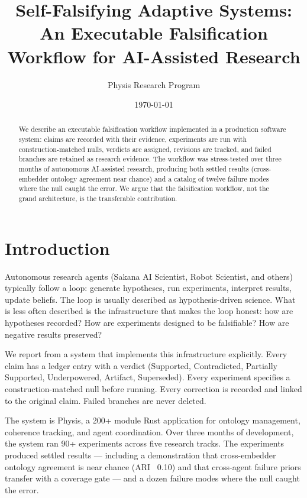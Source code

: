 \documentclass[11pt]{article}
\title{Self-Falsifying Adaptive Systems: An Executable Falsification Workflow for AI-Assisted Research}
\author{Physis Research Program}
\date{\today}
\begin{document}
\maketitle

\begin{abstract}
We describe an executable falsification workflow implemented in a
production software system: claims are recorded with their evidence,
experiments are run with construction-matched nulls, verdicts are
assigned, revisions are tracked, and failed branches are retained as
research evidence. The workflow was stress-tested over three months of
autonomous AI-assisted research, producing both settled results
(cross-embedder ontology agreement near chance) and a catalog of
twelve failure modes where the null caught the error. We argue that the
falsification workflow, not the grand architecture, is the transferable
contribution.
\end{abstract}

\section{Introduction}

Autonomous research agents (Sakana AI Scientist, Robot Scientist, and
others) typically follow a loop: generate hypotheses, run experiments,
interpret results, update beliefs. The loop is usually described as
hypothesis-driven science. What is less often described is the
infrastructure that makes the loop honest: how are hypotheses recorded?
How are experiments designed to be falsifiable? How are negative results
preserved?

We report from a system that implements this infrastructure explicitly.
Every claim has a ledger entry with a verdict (Supported, Contradicted,
Partially Supported, Underpowered, Artifact, Superseded). Every
experiment specifies a construction-matched null before running. Every
correction is recorded and linked to the original claim. Failed branches
are never deleted.

The system is Physis, a 200+ module Rust application for ontology
management, coherence tracking, and agent coordination. Over three
months of development, the system ran 90+ experiments across five
research tracks. The experiments produced settled results --- including a
demonstration that cross-embedder ontology agreement is near chance
(ARI ~0.10) and that cross-agent failure priors transfer with a
coverage gate --- and a dozen failure modes where the null caught the
error.
\end{document}
